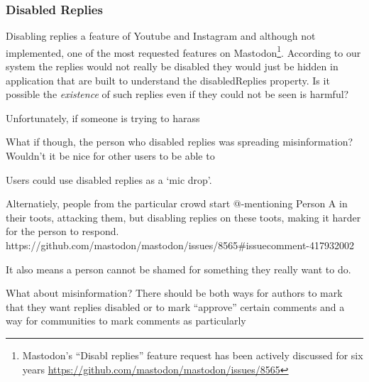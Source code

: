 \subsubsection{Disabled Replies}

Disabling replies a feature of Youtube and Instagram and although not
implemented, one of the most requested features on Mastodon\footnote{
    Mastodon's ``Disabl replies'' feature request has been actively discussed
    for six years
    \url{https://github.com/mastodon/mastodon/issues/8565}
}.
According to our system the replies would not really be disabled
they would just be hidden in application that are built to understand
the disabledReplies property.
Is it possible the \emph{existence} of such replies even if they could
not be seen is harmful?

Unfortunately, if someone is trying to harass

What if though, the person who disabled replies was spreading misinformation?
Wouldn't it be nice for other users to be able to

Users could use disabled replies as a `mic drop'.

Alternatiely,
people from the particular crowd start
@-mentioning Person A in their toots, attacking them,
but disabling replies on these toots, making it harder
for the person to respond.
https://github.com/mastodon/mastodon/issues/8565#issuecomment-417932002

It also means a person cannot be shamed for something they really
want to do.

What about misinformation? There should be both ways for authors to
mark that they want replies disabled or to mark ``approve'' certain comments
and a way for communities to
mark comments as particularly
